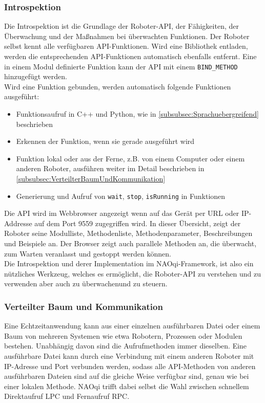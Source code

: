 \subsubsection{Introspektion}\label{subsubsec:Introspektion}
Die Introspektion ist die Grundlage der Roboter-\ac{API}, der Fähigkeiten, der Überwachung und der Maßnahmen bei überwachten Funktionen. Der Roboter selbst kennt alle verfügbaren \ac{API}-Funktionen. Wird eine Bibliothek entladen, werden die entsprechenden \ac{API}-Funktionen automatisch ebenfalls entfernt. Eine in einem Modul definierte Funktion kann der \ac{API} mit einem \texttt{BIND\_METHOD} hinzugefügt werden.\\
Wird eine Funktion gebunden, werden automatisch folgende Funktionen ausgeführt:\\
\begin{itemize}
    \item Funktionsaufruf in C++ und Python, wie in \autoref{subsubsec:Sprachuebergreifend} beschrieben
    \item Erkennen der Funktion, wenn sie gerade ausgeführt wird
    \item Funktion lokal oder aus der Ferne, z.B. von einem Computer oder einem anderen Roboter, ausführen weiter im Detail beschrieben in \autoref{subsubsec:VerteilterBaumUndKommunikation}
    \item Generierung und Aufruf von \texttt{wait}, \texttt{stop}, \texttt{isRunning} in Funktionen
\end{itemize}
Die \ac{API} wird im Webbrowser angezeigt wenn auf das Gerät per \ac{URL} oder \ac{IP}-Addresse auf dem Port 9559 zugegriffen wird. In dieser Übersicht, zeigt der Roboter seine Modulliste, Methodenliste, Methodenparameter, Beschreibungen und Beispiele an. Der Browser zeigt auch parallele Methoden an, die überwacht, zum Warten veranlasst und gestoppt werden können.\\
Die Introspektion und derer Implementation im NAOqi-Framework, ist also ein nützliches Werkzeug, welches es ermöglicht, die Roboter-\ac{API} zu verstehen und zu verwenden aber auch zu überwachenund zu steuern.\\

\subsubsection{Verteilter Baum und Kommunikation}\label{subsubsec:VerteilterBaumUndKommunikation}
Eine Echtzeitanwendung kann aus einer einzelnen ausführbaren Datei oder einem Baum von mehreren Systemen wie etwa Robotern, Prozessen oder Modulen bestehen. Unabhängig davon sind die Aufrufmethoden immer dieselben. Eine ausführbare Datei kann durch eine Verbindung mit einem anderen Roboter mit \ac{IP}-Adresse und Port verbunden werden, sodass alle \ac{API}-Methoden von anderen ausführbaren Dateien sind auf die gleiche Weise verfügbar sind, genau wie bei einer lokalen Methode. NAOqi trifft dabei selbst die Wahl zwischen schnellem Direktaufruf \ac{LPC} und Fernaufruf \ac{RPC}.\\

